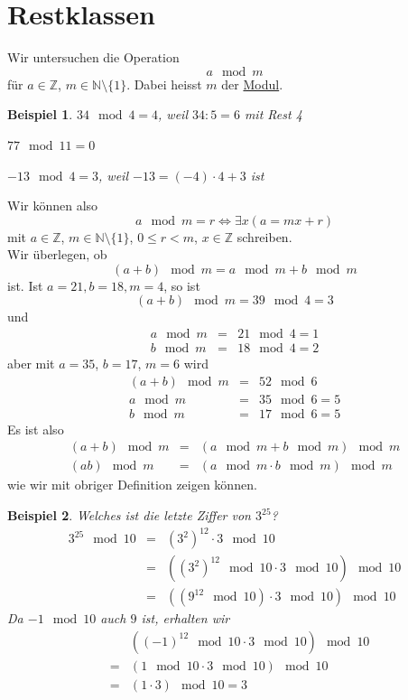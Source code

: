 \documentclass{report}
\newtheorem{myexample}{Beispiel}
\begin{document}
\section{Restklassen}
Wir untersuchen die Operation
\begin{equation} a \mod{m}\end{equation}
für $a \in \mathbb{Z}$, $m \in \mathbb{N} \setminus \{1\}$. Dabei heisst $m$ der \underline{Modul}.
\begin{myexample}\item $34 \mod{4} = 4$, weil $34 : 5 = 6$ mit Rest 4
\item $77 \mod{11} = 0$
\item $-13 \mod{4} = 3$, weil $-13 = (-4) \cdot 4 + 3$ ist\end{myexample}
Wir können also
\begin{equation}a \mod{m} = r \iff \exists x (a = mx + r)\end{equation}
mit $a \in \mathbb{Z}$, $m \in \mathbb{N} \setminus \{1\}$, $0 \leq r < m$, $x \in \mathbb{Z}$ schreiben.\\
Wir überlegen, ob
\begin{equation}(a + b) \mod{m} = a \mod{m} + b \mod {m}\end{equation}
ist. Ist $a = 21, b=18, m=4$, so ist
\begin{equation}(a+b) \mod{m} = 39 \mod{4} = 3\end{equation}
und
\begin{eqnarray}a \mod{m} & = & 21 \mod{4} = 1 \nonumber \\
b \mod{m} & = & 18 \mod{4} = 2\end{eqnarray}
aber mit $a = 35$, $b = 17$, $m = 6$ wird
\begin{eqnarray}(a + b) \mod{m} & = & 52 \mod{6} \nonumber \\
a \mod{m} & = & 35 \mod{6} = 5 \nonumber \\
b \mod{m} & = & 17 \mod{6} = 5\end{eqnarray}
Es ist also
\begin{eqnarray}(a+b) \mod{m} & = & (a \mod{m} + b \mod{m}) \mod{m} \nonumber \\
(ab) \mod{m} & = & (a \mod{m} \cdot b \mod{m}) \mod{m}\end{eqnarray}
wie wir mit obriger Definition zeigen können.
\begin{myexample}Welches ist die letzte Ziffer von $3^{25}$?
\begin{eqnarray}3^{25} \mod{10} & = & (3^2)^{12} \cdot 3 \mod{10} \nonumber \\
& = & ((3^2)^{12} \mod{10} \cdot 3 \mod{10}) \mod{10} \nonumber \\
& = & ((9^{12} \mod{10}) \cdot 3 \mod{10}) \mod{10}
\end{eqnarray}
Da $-1 \mod{10}$ auch $9$ ist, erhalten wir
\begin{eqnarray}& &((-1)^{12} \mod{10} \cdot 3 \mod{10}) \mod{10} \nonumber \\
& = & (1 \mod{10} \cdot 3 \mod{10}) \mod{10} \nonumber \\
& = & (1 \cdot 3) \mod{10} = 3\end{eqnarray}\end{myexample}
\end{document}
